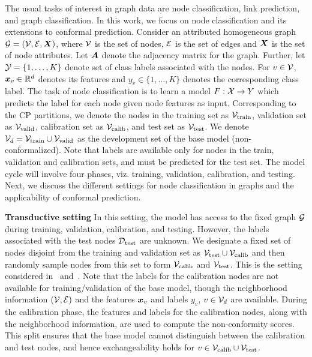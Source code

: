 The usual tasks of interest in graph data are node classification, link prediction, and graph classification. 
In this work, we focus on node classification and its extensions to conformal prediction.
Consider an attributed homogeneous graph ${\mathcal{G}} = ({\mathcal{V}}, {\mathcal{E}}, {\bm{X}})$, where ${\mathcal{V}}$ is the set of nodes, ${\mathcal{E}}$ is the set of edges and ${\bm{X}}$ is the set of node attributes.
Let ${\bm{A}}$ denote the adjacency matrix for the graph.
Further, let ${\mathcal{Y}} = \{1, \dots, K\}$ denote set of class labels associated with the nodes.
For $v \in {\mathcal{V}}$, ${\bm{x}}_v \in \mathbb{R}^d$ denotes its features and $y_v \in \{1, \dots, K\}$ denotes the corresponding class label.
The task of node classification is to learn a model $F: {\mathcal{X}} \to Y$ which predicts the label for each node given node features as input.
Corresponding to the CP partitions, we denote the nodes in the training set as ${\mathcal{V}}_{\text{train}}$, validation set as ${\mathcal{V}}_{\text{valid}}$, calibration set as ${\mathcal{V}}_{\text{calib}}$, and test set as ${\mathcal{V}}_{\text{test}}$.
We denote ${\mathcal{V}}_d = {\mathcal{V}}_{\text{train}} \cup {\mathcal{V}}_{\text{valid}}$ 
as the development set of the base model (non-conformalized). 
Note that labels are available only for nodes in the train, validation and calibration sets, and must be predicted for the test set.
The model cycle will involve four phases, viz. training, validation, calibration, and testing.
Next, we discuss the different settings for node classification in graphs and the applicability of conformal prediction.

\noindent \textbf{Transductive setting}
In this setting, the model has access to the fixed graph ${\mathcal{G}}$ during training, validation, calibration, and testing.
However, the labels associated with the test nodes ${\mathcal{D}}_{\text{test}}$ are unknown. 
We designate a fixed set of nodes disjoint from the training and validation set as  ${\mathcal{V}}_{\text{test}} \cup {\mathcal{V}}_{\text{calib}}$ and then randomly sample nodes from this set to form ${\mathcal{V}}_{\text{calib}}$ and ${\mathcal{V}}_{\text{test}}$.
This is the setting considered in~\citet{zargarbashi23conformal} and~\citet{huang2024uncertainty}.
Note that the labels for the calibration nodes are not available for training/validation of the base model, though the neighborhood information $({\mathcal{V}}, {\mathcal{E}})$ and the features ${\bm{x}}_v$ and labels $y_v$, $v \in {\mathcal{V}}_d$ are available.
During the calibration phase, the features and labels for the calibration nodes, along with the neighborhood information, are used to compute the non-conformity scores.
This split ensures that the base model cannot distinguish between the calibration and test nodes, and hence exchangeability holds for $v \in {\mathcal{V}}_{\text{calib}} \cup {\mathcal{V}}_{\text{test}}$.


